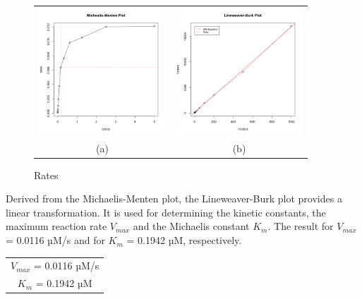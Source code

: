 \documentclass[a4paper,11pt]{article}
\begin{document}
                \begin{figure}[H]
                    \centering
                    \begin{tabular}{cc}
                        \includegraphics[width=180px]{../resources/kinetics_mmplot.png} &
                        \includegraphics[width=180px]{../resources/kinetics_lbplot.png} \\
                        (a) & (b)\\
                    \end{tabular}
                    \caption{Rates}\label{fig:mm_plot}
                \end{figure}

                Derived from the Michaelis-Menten plot, the Lineweaver-Burk plot provides a linear 
                transformation. It is used for determining the kinetic constants, the maximum reaction 
                rate $V_{max}$ and the Michaelis constant $K_m$. The result for $V_{max}$ = 0.0116 µM/s and for 
                $K_m$ = 0.1942 µM, respectively.

                \begin{center}
                    \begin{tabular}{|c|}
                        \hline 
                        $V_{max}$ = 0.0116 µM/s \\
                        $K_m$ = 0.1942 µM \\
                        \hline
                    \end{tabular}
                \end{center}
\end{document}
